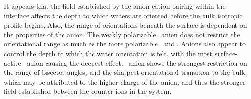 It appears that the field established by the anion-cation pairing within the interface affects the depth to which waters are oriented before the bulk isotropic profile begins. Also, the range of orientations beneath the surface is dependent on the properties of the anion. The weakly polarizable \cl~anion does not restrict the orientational range as much as the more polarizable \nit~and \sul. Anions also appear to control the depth to which the water orientation is felt, with the most surface-active \nit~anion causing the deepest effect. \sul~anion shows the strongest restriction on the range of bisector angles, and the sharpest orientational transition to the bulk, which may be attributed to the higher charge of the anion, and thus the stronger field established between the counter-ions in the system.



\newcommand{\phiprof}{$\phi$-profile~}

